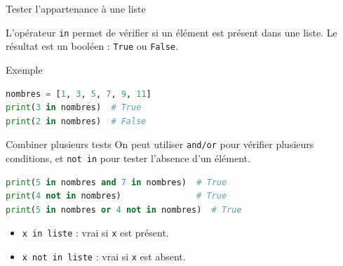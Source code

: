 \documentclass[10pt]{beamer}
\begin{document}
\begin{frame}[fragile]{Tester l'appartenance à une liste}

L'opérateur \texttt{in} permet de vérifier si un élément est présent
dans une liste. Le résultat est un booléen : \texttt{True} ou \texttt{False}.

\begin{exampleblock}{Exemple}
\begin{lstlisting}[language=Python]
nombres = [1, 3, 5, 7, 9, 11]
print(3 in nombres)  # True
print(2 in nombres)  # False
\end{lstlisting}
\end{exampleblock}

\pause

\begin{block}{Combiner plusieurs tests}
On peut utiliser \texttt{and/or} pour vérifier plusieurs conditions,
et \texttt{not in} pour tester l'absence d'un élément.
\begin{lstlisting}[language=Python]
print(5 in nombres and 7 in nombres)  # True
print(4 not in nombres)               # True
print(5 in nombres or 4 not in nombres)  # True
\end{lstlisting}
\end{block}

\pause

\begin{itemize}
    \item \texttt{x in liste} : vrai si \texttt{x} est présent.
    \item \texttt{x not in liste} : vrai si \texttt{x} est absent.
\end{itemize}

\end{frame}
\end{document}
